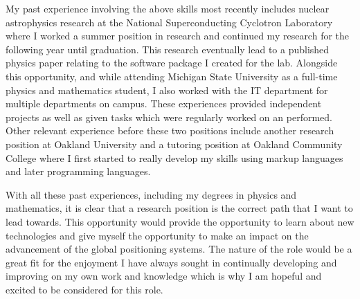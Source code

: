 \documentclass[10pt,a4paper,sans]{moderncv} %
\begin{document}
\hspace{1cm}My past experience involving the above skills most recently includes nuclear astrophysics research at the National Superconducting Cyclotron Laboratory where I worked a summer position in research and continued my research for the following year until graduation. This research eventually lead to a published physics paper relating to the software package I created for the lab. Alongside this opportunity, and while attending Michigan State University as a full-time physics and mathematics student, I also worked with the IT department for multiple departments on campus. These experiences provided independent projects as well as given tasks which were regularly worked on an performed. Other relevant experience before these two positions include another research position at Oakland University and a tutoring position at Oakland Community College where I first started to really develop my skills using markup languages and later programming languages.

\hspace{1cm}With all these past experiences, including my degrees in physics and mathematics, it is clear that a research position is the correct path that I want to lead towards. This opportunity would provide the opportunity to learn about new technologies and give myself the opportunity to make an impact on the advancement of the global positioning systems. The nature of the role would be a great fit for the enjoyment I have always sought in continually developing and improving on my own work and knowledge which is why I am hopeful and excited to be considered for this role.  


\makeletterclosing %

\end{document}
